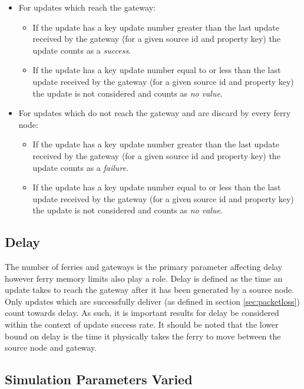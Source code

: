 \begin{itemize}
\item For updates which reach the gateway:
	\begin{itemize}
	\item If the update has a key update number greater than the last update received by the gateway (for a given source id and property key) the update counts as a \emph{success}.
	\item If the update has a key update number equal to or less than the last update received by the gateway (for a given source id and property key) the update is not considered and counts as \emph{no value}.
	\end{itemize}
\item For updates which do not reach the gateway and are discard by every ferry node:
	\begin{itemize}
	\item If the update has a key update number greater than the last update received by the gateway (for a given source id and property key) the update counts as a \emph{failure}.
	\item If the update has a key update number equal to or less than the last update received by the gateway (for a given source id and property key) the update is not considered and counts as \emph{no value}.
	\end{itemize}
\end{itemize}

\subsection{Delay}
\label{sec:delay}

The number of ferries and gateways is the primary parameter affecting delay however ferry memory limits also play a role.
Delay is defined as the time an update takes to reach the gateway after it has been generated by a source node.
Only updates which are successfully deliver (as defined in section \ref{sec:packetloss}) 
count towards delay.
As such, it is important results for delay be considered within the context of update success rate.
It should be noted that the lower bound on delay is the time it physically takes the ferry to move between the source node and gateway.

\subsection{Simulation Parameters Varied} %

